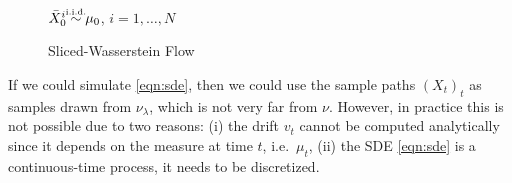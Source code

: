 \begin{wrapfigure}{R}{0.52\textwidth}
    \begin{minipage}{0.52\textwidth}
     \begin{algorithm2e} [H]
		 \SetInd{0.1ex}{1.5ex}
		 \DontPrintSemicolon
		 {\color{purple} \small {}}
		 $\bar{X}_0^i \simiid \mu_0$, \hfill $i = 1,\dots,N$ \\%
		 \caption{Sliced-Wasserstein Flow}
		 \label{algo:flow}
	 \end{algorithm2e}
\end{minipage}
\vspace{-20pt}
\end{wrapfigure}

If we could simulate \eqref{eqn:sde}, then we could use the sample paths $(X_t)_t$ as
samples drawn from $\nu_\lambda$, which is not very far from $\nu$. However, in practice this is not possible due to two reasons: (i) the drift $v_t$ cannot be computed analytically since it depends on the measure at time $t$, i.e.\ $\mu_t$, (ii) the SDE \eqref{eqn:sde} is a continuous-time process, it needs to be discretized.  

